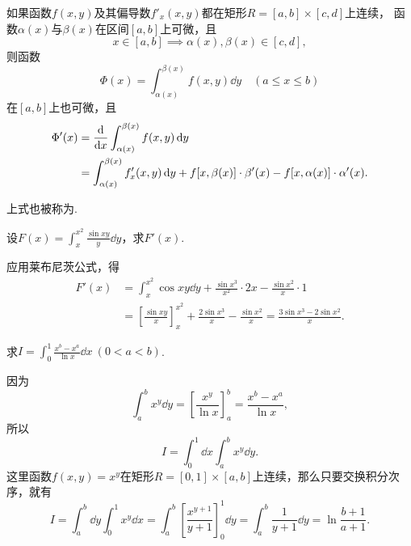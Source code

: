 \begin{theorem}
如果函数\(f(x,y)\)及其偏导数\(f'_x(x,y)\)都在矩形\(R=[a,b]\times[c,d]\)上连续，
函数\(\alpha(x)\)与\(\beta(x)\)在区间\([a,b]\)上可微，且\[
x \in [a,b] \implies \alpha(x),\beta(x) \in [c,d],
\]则函数\[
\Phi(x) = \int_{\alpha(x)}^{\beta(x)} f(x,y)\dd{y}
\quad(a \leq x \leq b)
\]在\([a,b]\)上也可微，且\begin{align*}
\Phi'(x) &= \dv{x} \int_{\alpha(x)}^{\beta(x)} f(x,y) \dd{y} \\
&= \int_{\alpha(x)}^{\beta(x)} f'_x(x,y) \dd{y}
	+ f[x,\beta(x)] \cdot \beta'(x)
	- f[x,\alpha(x)] \cdot \alpha'(x).
\end{align*}
\end{theorem}
上式也被称为.

\begin{example}
设\(F(x) = \int_x^{x^2} \frac{\sin xy}{y} \dd{y}\)，求\(F'(x)\).
\begin{solution}
应用莱布尼茨公式，得\begin{align*}
F'(x) &= \int_x^{x^2} \cos xy \dd{y}
+ \frac{\sin x^3}{x^2} \cdot 2x
- \frac{\sin x^2}{x} \cdot 1 \\
&= \left[ \frac{\sin xy}{x} \right]_x^{x^2}
+ \frac{2 \sin x^3}{x}
- \frac{\sin x^2}{x}
= \frac{3 \sin x^3 - 2 \sin x^2}{x}.
\end{align*}
\end{solution}
\end{example}

\begin{example}
求\(I = \int_0^1 \frac{x^b-x^a}{\ln x} \dd{x}\ (0<a<b)\).
\begin{solution}
因为\[
\int_a^b x^y \dd{y}
= \left[ \frac{x^y}{\ln x} \right]_a^b
= \frac{x^b - x^a}{\ln x},
\]所以\[
I = \int_0^1 \dd{x} \int_a^b x^y \dd{y}.
\]这里函数\(f(x,y) = x^y\)在矩形\(R=[0,1]\times[a,b]\)上连续，那么只要交换积分次序，就有\[
I = \int_a^b \dd{y} \int_0^1 x^y \dd{x}
= \int_a^b \left[\frac{x^{y+1}}{y+1}\right]_0^1 \dd{y}
= \int_a^b \frac{1}{y+1} \dd{y}
= \ln\frac{b+1}{a+1}.
\]
\end{solution}
\end{example}

